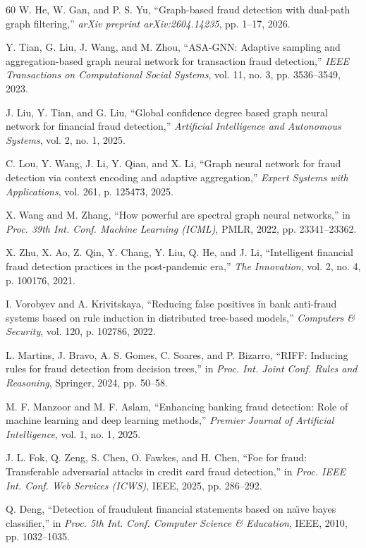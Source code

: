 \documentclass[10pt,a4paper,twocolumn]{article}
\begin{document}
\begin{thebibliography}{60}
 W. He, W. Gan, and P. S. Yu, ``Graph-based fraud detection with dual-path graph filtering,'' \textit{arXiv preprint arXiv:2604.14235}, pp. 1--17, 2026.

 Y. Tian, G. Liu, J. Wang, and M. Zhou, ``ASA-GNN: Adaptive sampling and aggregation-based graph neural network for transaction fraud detection,'' \textit{IEEE Transactions on Computational Social Systems}, vol. 11, no. 3, pp. 3536--3549, 2023.

 J. Liu, Y. Tian, and G. Liu, ``Global confidence degree based graph neural network for financial fraud detection,'' \textit{Artificial Intelligence and Autonomous Systems}, vol. 2, no. 1, 2025.

 C. Lou, Y. Wang, J. Li, Y. Qian, and X. Li, ``Graph neural network for fraud detection via context encoding and adaptive aggregation,'' \textit{Expert Systems with Applications}, vol. 261, p. 125473, 2025.

 X. Wang and M. Zhang, ``How powerful are spectral graph neural networks,'' in \textit{Proc. 39th Int. Conf. Machine Learning (ICML)}, PMLR, 2022, pp. 23341--23362.

 X. Zhu, X. Ao, Z. Qin, Y. Chang, Y. Liu, Q. He, and J. Li, ``Intelligent financial fraud detection practices in the post-pandemic era,'' \textit{The Innovation}, vol. 2, no. 4, p. 100176, 2021.

 I. Vorobyev and A. Krivitskaya, ``Reducing false positives in bank anti-fraud systems based on rule induction in distributed tree-based models,'' \textit{Computers \& Security}, vol. 120, p. 102786, 2022.

 L. Martins, J. Bravo, A. S. Gomes, C. Soares, and P. Bizarro, ``RIFF: Inducing rules for fraud detection from decision trees,'' in \textit{Proc. Int. Joint Conf. Rules and Reasoning}, Springer, 2024, pp. 50--58.

 M. F. Manzoor and M. F. Aslam, ``Enhancing banking fraud detection: Role of machine learning and deep learning methods,'' \textit{Premier Journal of Artificial Intelligence}, vol. 1, no. 1, 2025.

 J. L. Fok, Q. Zeng, S. Chen, O. Fawkes, and H. Chen, ``Foe for fraud: Transferable adversarial attacks in credit card fraud detection,'' in \textit{Proc. IEEE Int. Conf. Web Services (ICWS)}, IEEE, 2025, pp. 286--292.

 Q. Deng, ``Detection of fraudulent financial statements based on na\"{\i}ve bayes classifier,'' in \textit{Proc. 5th Int. Conf. Computer Science \& Education}, IEEE, 2010, pp. 1032--1035.


\end{thebibliography}
\end{document}
